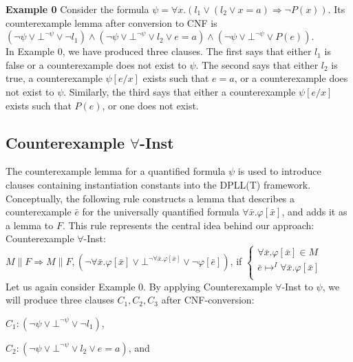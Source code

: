 \documentclass{llncs}
\begin{document}
{\bf Example 0}
Consider the formula $\psi = \forall x. ( l_1 \vee ( l_2 \vee x = a ) \Rightarrow \neg P( x ) )$.
Its counterexample lemma after conversion to CNF is $( \neg \psi \vee \bot^{\neg \psi} \vee \neg l_1 ) \wedge ( \neg \psi \vee \bot^{\neg \psi} \vee l_2 \vee e = a ) \wedge ( \neg \psi \vee \bot^{\neg \psi} \vee P( e ) ) $. \\

In Example 0, we have produced three clauses.
The first says that either $l_1$ is false or a counterexample does not exist to $\psi$.
The second says that either $l_2$ is true, a counterexample $\psi[e/x]$ exists such that $e = a$, or a counterexample does not exist to $\psi$. 
Similarly, the third says that either a counterexample $\psi[e/x]$ exists such that $P( e )$, or one does not exist.

\subsection{Counterexample $\forall$-Inst}

The counterexample lemma for a quantified formula $\psi$ is used to introduce clauses containing instantiation constants into the DPLL(T) framework.
Conceptually, the following rule constructs a lemma that describes a counterexample $\bar{e}$ for the universally quantified formula $\forall \bar{x}. \varphi[ \bar{ x } ]$, and adds it as a lemma to $F$.
This rule represents the central idea behind our approach: \\

\noindent Counterexample $\forall$-Inst: \\

$M \parallel F \Longrightarrow M \parallel F, (\neg \forall \bar{x}. \varphi[ \bar{x} ] \vee \bot^{\neg \forall \bar{x}. \varphi[ \bar{x} ]} \vee \neg \varphi[ \bar{ e } ])$, if   
$\begin{cases}
  \forall \bar{x}. \varphi[ \bar{ x } ] \in M \\
  \bar{ e } \mapsto^I \forall \bar{x}. \varphi[ \bar{ x } ] \\
\end{cases}$ \\

Let us again consider Example 0.
By applying Counterexample $\forall$-Inst to $\psi$, we will produce three clauses $C_1, C_2, C_3$ after CNF-conversion:

$C_1 : ( \neg \psi \vee \bot^{\neg \psi} \vee \neg l_1 )$,

$C_2 : ( \neg \psi \vee \bot^{\neg \psi} \vee l_2 \vee e = a )$, and
\end{document}
